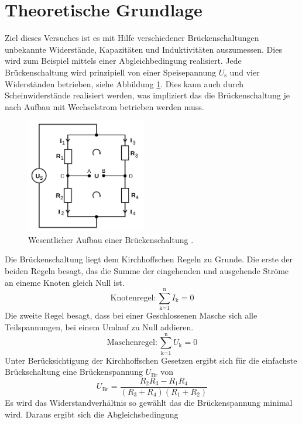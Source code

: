 \section{Theoretische Grundlage}
\label{sec:Theorie}

Ziel dieses Versuches ist es mit Hilfe verschiedener Brückenschaltungen unbekannte Widerstände, Kapazitäten und Induktivitäten auszumessen. Dies wird zum Beispiel mittels einer Abgleichbedingung realisiert.
Jede Brückenschaltung wird prinzipiell von einer Speisepannung $U_\text{s}$ und vier Widerständen betrieben, siehe Abbildung \ref{fig:wheatstone}. Dies kann auch durch Scheinwiderstände realisiert werden, was impliziert das die Brückenschaltung je nach Aufbau mit Wechselstrom betrieben werden muss.
\begin{figure}[H]
	\centering
	\includegraphics[height=5cm]{picture/1.png}
	\caption{Wesentlicher Aufbau einer Brückenschaltung \cite{sample}.}
	\label{fig:wheatstone}
\end{figure}
Die Brückenschaltung liegt dem Kirchhoffschen Regeln zu Grunde. Die erste der beiden Regeln besagt, das die Summe der eingehenden und ausgehende Ströme an eineme Knoten gleich Null ist.
\begin{equation}
  \text{Knotenregel} : \sum_{\text{k=1}}^\text{n} I_\text{k} = 0
  \label{eqn:K1}
\end{equation}
Die zweite Regel besagt, dass bei einer Geschlossenen Masche sich alle Teilspannungen, bei einem Umlauf zu Null addieren.
\begin{equation}
  \text{Maschenregel} : \sum_{\text{k=1}}^\text{n} U_\text{k} = 0
  \label{eqn:K2}
\end{equation}
Unter Berücksichtigung der Kirchhoffschen Gesetzen ergibt sich für die einfachste Brückschaltung eine Brückenspannung $U_\text{Br}$ von
\begin{equation}
  U_\text{Br} = \frac{R_2 R_3 - R_1 R_4}{(R_3 + R_4)(R_1 + R_2)}
  \label{eqn:Ubr}
\end{equation}
Es wird das Widerstandverhältnis so gewählt das die Brückenspannung minimal wird. Daraus ergibt sich die Abgleichsbedingung
